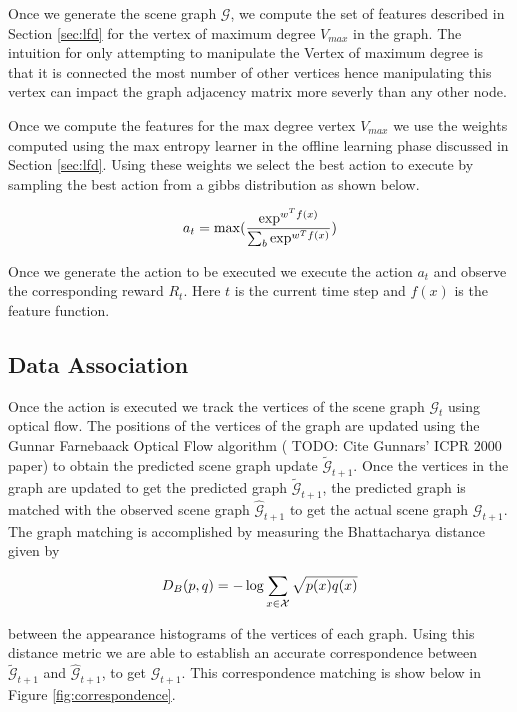 Once we generate the scene graph $\mathcal{G}$, we compute the set of features described in Section \ref{sec:lfd} for the vertex of maximum degree $V_{max}$ in the graph. The intuition for only attempting to manipulate the Vertex of maximum degree is that it is connected the most number of other vertices hence manipulating this vertex can impact the graph adjacency matrix more severly than any other node.

Once we compute the features for the max degree vertex $V_{max}$ we use the weights computed using the max entropy learner in the offline learning phase discussed in Section \ref{sec:lfd}. Using these weights we select the best action to execute by sampling the best action from a gibbs distribution as shown below.

\[
a_t = \max(\frac{\exp^{w^Tf(x)}}{ \sum_b\exp^{w^Tf(x)}})\\
\]

Once we generate the action to be executed we execute the action $a_t$ and observe the corresponding reward $R_t$. Here $t$ is the current time step and $f(x)$ is the feature function.

\subsection{Data Association}
Once the action is executed we track the vertices of the scene graph $\mathcal{G}_t$ using optical flow. The positions of the vertices of the graph are updated using the Gunnar Farnebaack Optical Flow algorithm (\cite{Javidi12_Journal} TODO: Cite Gunnars' ICPR 2000 paper) to obtain the predicted scene graph update $\tilde{\mathcal{G}}_{t+1}$. Once the vertices in the graph are updated to get the predicted graph $\tilde{\mathcal{G}}_{t+1}$, the predicted graph is matched with the observed scene graph $\hat{\mathcal{G}}_{t+1}$ to get the actual scene graph $\mathcal{G}_{t+1}$. The graph matching is accomplished by measuring the Bhattacharya distance given by

\[
D_B(p,q) = -\log{\sum_{x\in\mathcal{X}}\sqrt{p(x)q(x)}}\\
\]

between the appearance histograms of the vertices of each graph. Using this distance metric we are able to establish an accurate correspondence between $\tilde{\mathcal{G}}_{t+1}$ and $\hat{\mathcal{G}}_{t+1}$, to get $\mathcal{G}_{t+1}$. This correspondence matching is show below in Figure \ref{fig:correspondence}.

